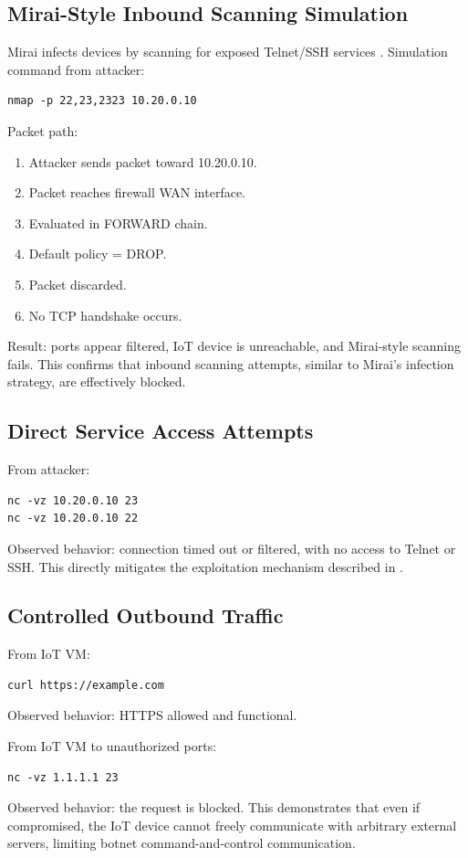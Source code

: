 \documentclass[journal]{IEEEtran}
\begin{document}
\subsection{Mirai-Style Inbound Scanning Simulation}
Mirai infects devices by scanning for exposed Telnet/SSH services \cite{mirai_usenix}. Simulation command from attacker:
\begin{lstlisting}
nmap -p 22,23,2323 10.20.0.10
\end{lstlisting}

Packet path:
\begin{enumerate}
\item Attacker sends packet toward 10.20.0.10.
\item Packet reaches firewall WAN interface.
\item Evaluated in FORWARD chain.
\item Default policy = DROP.
\item Packet discarded.
\item No TCP handshake occurs.
\end{enumerate}

Result: ports appear filtered, IoT device is unreachable, and Mirai-style scanning fails. This confirms that inbound scanning attempts, similar to Mirai's infection strategy, are effectively blocked.

\subsection{Direct Service Access Attempts}
From attacker:
\begin{lstlisting}
nc -vz 10.20.0.10 23
nc -vz 10.20.0.10 22
\end{lstlisting}
Observed behavior: connection timed out or filtered, with no access to Telnet or SSH. This directly mitigates the exploitation mechanism described in \cite{mirai_usenix}.

\subsection{Controlled Outbound Traffic}
From IoT VM:
\begin{lstlisting}
curl https://example.com
\end{lstlisting}
Observed behavior: HTTPS allowed and functional.

From IoT VM to unauthorized ports:
\begin{lstlisting}
nc -vz 1.1.1.1 23
\end{lstlisting}
Observed behavior: the request is blocked. This demonstrates that even if compromised, the IoT device cannot freely communicate with arbitrary external servers, limiting botnet command-and-control communication.
\end{document}
